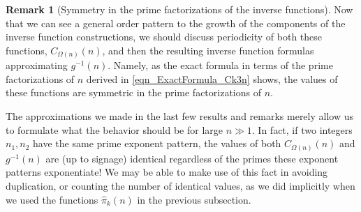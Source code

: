 \documentclass[11pt,reqno,a4letter]{article}
\numberwithin{figure}{section}
\numberwithin{table}{section}
\theoremstyle{plain}
\numberwithin{theorem}{section}
\theoremstyle{definition}
\newtheorem{remark}[theorem]{Remark}
\begin{document}
\begin{remark}[Symmetry in the prime factorizations of the inverse functions] 
Now that we can see a general order pattern to the growth of the components of 
the inverse function constructions, we should discuss periodicity of both these 
functions, $C_{\Omega(n)}(n)$, and then the resulting inverse function formulas  
approximating $g^{-1}(n)$. Namely, as the exact formula in terms of the prime 
factorizations of $n$ derived in \eqref{eqn_ExactFormula_Ck3n} shows, the values of 
these functions are symmetric in the prime factorizations of $n$. 

The approximations 
we made in the last few results and remarks merely allow us to formulate what the 
behavior should be for large $n \gg 1$. In fact, if two integers $n_1, n_2$ have the 
same prime exponent pattern, the values of both $C_{\Omega(n)}(n)$ and 
$g^{-1}(n)$ are (up to signage) identical regardless of the primes these exponent 
patterns exponentiate! We may be able to make use of this fact in avoiding duplication, 
or counting the number of identical values, as we did implicitly when we used the 
functions $\widehat{\pi}_k(n)$ in the previous subsection. 
\end{remark}
\end{document}
